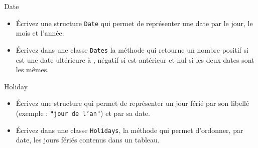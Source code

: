 \documentclass[a4paper,11pt]{style-esi/td}
\begin{document}
	\begin{Exercice}{Date}
		\begin{itemize}
			\item
				Écrivez une structure \texttt{Date} qui permet de représenter une date par le jour, le mois et l'année.
			\item 
				Écrivez dans une classe \texttt{Dates} la méthode  qui retourne un nombre positif si  est une date ultérieure à , négatif si  est antérieur et nul si les deux dates sont les mêmes.
		\end{itemize}		
	\end{Exercice}

	\begin{Exercice}{Holiday}
		\begin{itemize}
			\item
				Écrivez une structure qui permet de représenter un jour férié par son libellé (exemple : \texttt{"jour de l'an"}) et par sa date.
			\item 
				Écrivez dans une classe \texttt{Holidays}, la méthode  qui permet d'ordonner, par date, les jours fériés contenus dans un tableau.
		\end{itemize}		
	\end{Exercice}
\end{document}
